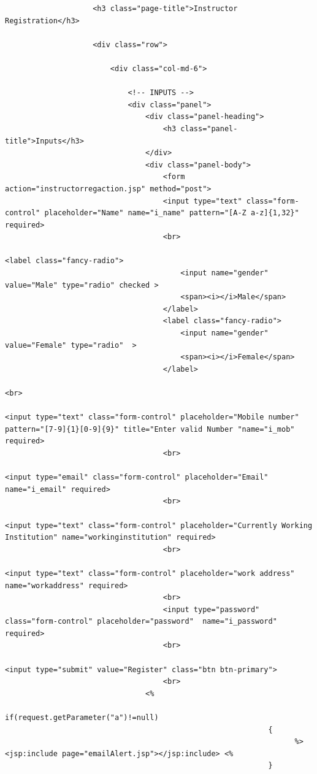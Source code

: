 \begin{lstlisting}
					<h3 class="page-title">Instructor Registration</h3>
                                        
					<div class="row">
                                            
						<div class="col-md-6">
							
							<!-- INPUTS -->
							<div class="panel">
								<div class="panel-heading">
									<h3 class="panel-title">Inputs</h3>
								</div>
								<div class="panel-body">
									<form action="instructorregaction.jsp" method="post">
									<input type="text" class="form-control" placeholder="Name" name="i_name" pattern="[A-Z a-z]{1,32}" required>
									<br>
                                                                        <label class="fancy-radio">
										<input name="gender" value="Male" type="radio" checked >
										<span><i></i>Male</span>
									</label>
									<label class="fancy-radio">
										<input name="gender" value="Female" type="radio"  >
										<span><i></i>Female</span>
									</label>
                                                                        <br>
                                                                        <input type="text" class="form-control" placeholder="Mobile number" pattern="[7-9]{1}[0-9]{9}" title="Enter valid Number "name="i_mob" required>
									<br>
                                                                        <input type="email" class="form-control" placeholder="Email" name="i_email" required>
									<br>
                                                                        <input type="text" class="form-control" placeholder="Currently Working Institution" name="workinginstitution" required>
									<br>
                                                                        <input type="text" class="form-control" placeholder="work address" name="workaddress" required>
									<br>
									<input type="password" class="form-control" placeholder="password"  name="i_password" required>
									<br>
                                                                        <input type="submit" value="Register" class="btn btn-primary">
									<br>
								<%
                                                            if(request.getParameter("a")!=null)
                                                            {
                                                                  %> <jsp:include page="emailAlert.jsp"></jsp:include> <%
                                                            }
                                                        

\end{lstlisting}
